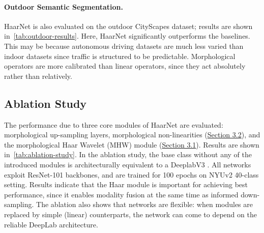 \documentclass{article}
\newcommand{\myparagraph}[1]{\paragraph{\textbf{\textup{#1.}}}}
\begin{document}
\myparagraph{Outdoor Semantic Segmentation}
HaarNet is also evaluated on the outdoor CityScapes dataset; results are shown in~\autoref{tab:outdoor-results}.
Here, HaarNet significantly outperforms the baselines.
This may be because autonomous driving datasets are much less varied than indoor datasets since traffic is structured to be predictable.
Morphological operators are more calibrated than linear operators, since they act absolutely rather than relatively.
\begin{table}[t]
    \centering
    \caption{\textbf{Ablation Study.}
    Rows show performance due to the morphological up-sampling layers (M-UP), morphological non-linearities (M-ReLU), and the Haar module (MHW).
    Modules are replaced with simple (linear) counterparts when possible.
    Results indicate that, while networks adapt to the available modules, a network that is a full linear-morphological hybrid performs best.
    }
    \label{tab:ablation-study}
\end{table}

\subsection{Ablation Study} \label{sec:experiments:ablation-study}
The performance due to three core modules of HaarNet are evaluated: morphological up-sampling layers, morphological non-linearities (\hyperref[sec:method:relu-as-dilation]{Section 3.2}), and the morphological Haar Wavelet (MHW) module (\hyperref[sec:method:haar-module]{Section 3.1}).
Results are shown in~\autoref{tab:ablation-study}.
In the ablation study, the base class without any of the introduced modules is architecturally equivalent to a DeeplabV3 \cite{chen2017deeplab}.
All networks exploit ResNet-101 backbones, and are trained for 100 epochs on NYUv2 40-class setting.
Results indicate that the Haar module is important for achieving best performance, since it enables modality fusion at the same time as informed down-sampling.
The ablation also shows that networks are flexible: when modules are replaced by simple (linear) counterparts, the network can come to depend on the reliable DeepLab architecture.
\end{document}
